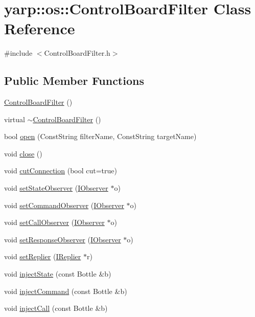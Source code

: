 \hypertarget{classyarp_1_1os_1_1_control_board_filter}{
\section{yarp::os::ControlBoardFilter Class Reference}
\label{classyarp_1_1os_1_1_control_board_filter}
}


{\ttfamily \#include $<$ControlBoardFilter.h$>$}\subsection*{Public Member Functions}
\begin{DoxyCompactItemize}
\item 
\hyperlink{classyarp_1_1os_1_1_control_board_filter_a4cd0bdff78668dd46a8a567b3ce60144}{ControlBoardFilter} ()
\item 
virtual \hyperlink{classyarp_1_1os_1_1_control_board_filter_a5c3f6dd113745a570fd06d616cc4e16a}{$\sim$ControlBoardFilter} ()
\item 
bool \hyperlink{classyarp_1_1os_1_1_control_board_filter_a27f3aa5419bce6ad6e421ddcb2e52131}{open} (ConstString filterName, ConstString targetName)
\item 
void \hyperlink{classyarp_1_1os_1_1_control_board_filter_a6224733f849144002f5b0f89f30ffb17}{close} ()
\item 
void \hyperlink{classyarp_1_1os_1_1_control_board_filter_a97baafa3310ec3ecad9c348c29c8b09c}{cutConnection} (bool cut=true)
\item 
void \hyperlink{classyarp_1_1os_1_1_control_board_filter_af23fad9bab89b2a57c4fb32eb99d76ef}{setStateObserver} (\hyperlink{classyarp_1_1os_1_1_i_observer}{IObserver} $\ast$o)
\item 
void \hyperlink{classyarp_1_1os_1_1_control_board_filter_a2500ae8300c6ca835f5b25133e1d04ed}{setCommandObserver} (\hyperlink{classyarp_1_1os_1_1_i_observer}{IObserver} $\ast$o)
\item 
void \hyperlink{classyarp_1_1os_1_1_control_board_filter_a72b5abaf68eb361c79d9de5071eb36b9}{setCallObserver} (\hyperlink{classyarp_1_1os_1_1_i_observer}{IObserver} $\ast$o)
\item 
void \hyperlink{classyarp_1_1os_1_1_control_board_filter_acf3896d97b179e36d41d275087c33c4e}{setResponseObserver} (\hyperlink{classyarp_1_1os_1_1_i_observer}{IObserver} $\ast$o)
\item 
void \hyperlink{classyarp_1_1os_1_1_control_board_filter_a6d3b3916553af9221093518d93c49c99}{setReplier} (\hyperlink{classyarp_1_1os_1_1_i_replier}{IReplier} $\ast$r)
\item 
void \hyperlink{classyarp_1_1os_1_1_control_board_filter_a379021d871cc1d375d8ea2107b74911d}{injectState} (const Bottle \&b)
\item 
void \hyperlink{classyarp_1_1os_1_1_control_board_filter_a329bcebdddb5afbd7a5e7303e6941311}{injectCommand} (const Bottle \&b)
\item 
void \hyperlink{classyarp_1_1os_1_1_control_board_filter_a46da5eabf941da5694107bf2d4adc075}{injectCall} (const Bottle \&b)
\end{DoxyCompactItemize}


